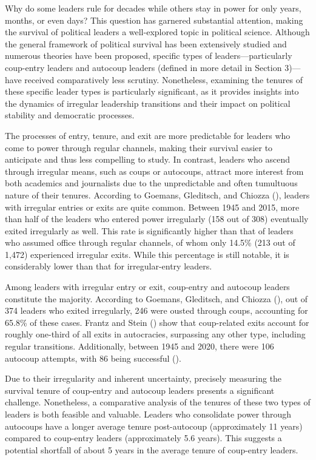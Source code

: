 \documentclass[
  12pt,
]{report}
\begin{document}
Why do some leaders rule for decades while others stay in power for only
years, months, or even days? This question has garnered substantial
attention, making the survival of political leaders a well-explored
topic in political science. Although the general framework of political
survival has been extensively studied and numerous theories have been
proposed, specific types of leaders---particularly coup-entry leaders
and autocoup leaders (defined in more detail in Section 3)---have
received comparatively less scrutiny. Nonetheless, examining the tenures
of these specific leader types is particularly significant, as it
provides insights into the dynamics of irregular leadership transitions
and their impact on political stability and democratic processes.

The processes of entry, tenure, and exit are more predictable for
leaders who come to power through regular channels, making their
survival easier to anticipate and thus less compelling to study. In
contrast, leaders who ascend through irregular means, such as coups or
autocoups, attract more interest from both academics and journalists due
to the unpredictable and often tumultuous nature of their tenures.
According to Goemans, Gleditsch, and Chiozza
(), leaders with irregular entries or
exits are quite common. Between 1945 and 2015, more than half of the
leaders who entered power irregularly (158 out of 308) eventually exited
irregularly as well. This rate is significantly higher than that of
leaders who assumed office through regular channels, of whom only 14.5\%
(213 out of 1,472) experienced irregular exits. While this percentage is
still notable, it is considerably lower than that for irregular-entry
leaders.

Among leaders with irregular entry or exit, coup-entry and autocoup
leaders constitute the majority. According to Goemans, Gleditsch, and
Chiozza (), out of 374 leaders who
exited irregularly, 246 were ousted through coups, accounting for 65.8\%
of these cases. Frantz and Stein () show
that coup-related exits account for roughly one-third of all exits in
autocracies, surpassing any other type, including regular transitions.
Additionally, between 1945 and 2020, there were 106 autocoup attempts,
with 86 being successful ().

Due to their irregularity and inherent uncertainty, precisely measuring
the survival tenure of coup-entry and autocoup leaders presents a
significant challenge. Nonetheless, a comparative analysis of the
tenures of these two types of leaders is both feasible and valuable.
Leaders who consolidate power through autocoups have a longer average
tenure post-autocoup (approximately 11 years) compared to coup-entry
leaders (approximately 5.6 years). This suggests a potential shortfall
of about 5 years in the average tenure of coup-entry leaders.
\end{document}
